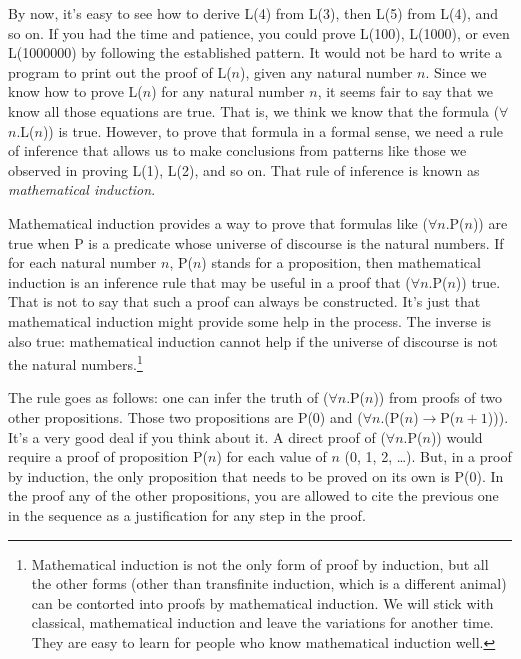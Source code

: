 \label{induction-rationale}
By now, it's easy to see how to derive L(4) from L(3),
then L(5) from L(4), and so on.
If you had the time and patience, you could prove L(100), L(1000), or even L(1000000)
by following the established pattern.
It would not be hard to write a program to print out the proof of L($n$),
given any natural number $n$.
Since we know how to prove L($n$) for any natural number $n$,
it seems fair to say that we know all those equations are true.
That is, we think we know that the formula ($\forall$$n$.L($n$)) is true.
However, to prove that formula in a formal sense,
we need a rule of inference that allows us to make conclusions
from patterns like those we observed in proving L(1), L(2), and so on.
That rule of inference is known as \emph{mathematical induction}.

Mathematical induction provides a way to prove that
formulas like ($\forall$$n$.P($n$)) are true
when P is a predicate whose universe of discourse is the natural numbers.
If for each natural number $n$, P($n$) stands for a proposition,
then mathematical induction is an inference rule that may be useful
in a proof that ($\forall$$n$.P($n$)) true.
That is not to say that such a proof can always be constructed.
It's just that mathematical induction might provide some help in the process.
The inverse is also true: mathematical induction cannot help
if the universe of discourse is not the natural numbers.\footnote{Mathematical 
induction is not the only form
of proof by induction, but all the other forms
(other than transfinite induction, which is a different animal)
can be contorted into proofs by mathematical induction.
We will stick with classical, mathematical induction
and leave the variations for another time.
They are easy to learn for people who know mathematical induction well.}

The rule goes as follows: one can infer the truth of ($\forall$$n$.P($n$))
from proofs of two other propositions.
Those two propositions are P(0) and ($\forall$$n$.(P($n$)$\rightarrow$P($n+1$))).
It's a very good deal if you think about it.
A direct proof of ($\forall$$n$.P($n$)) would require a proof of proposition P($n$)
for each value of $n$ (0, 1, 2, \dots).
But, in a proof by induction, the only proposition that needs to be proved on its own is P(0).
In the proof any of the other propositions,
you are allowed to cite the previous one in the sequence as a justification for any step in the proof.


